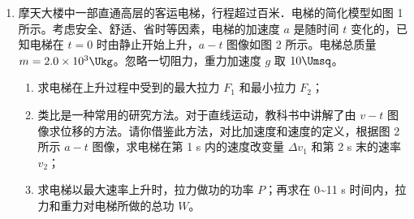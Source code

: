 \documentclass[\gkver]{gaokaozhenti}
\begin{document}
\begin{enumerate}
{\begin{enumerate}
	\item
	$0.90\UJ$

	\item
	$4.0\Ums$

\end{enumerate}
}

\item
摩天大楼中一部直通高层的客运电梯，行程超过百米．电梯的简化模型如图 1 所示。考虑安全、舒适、省时等因素，电梯的加速度 $a$ 是随时间 $t$ 变化的，已知电梯在 $t = 0$ 时由静止开始上升，$a-t$ 图像如图 2 所示。电梯总质量 $m = 2.0\times10^{3}\Ukg$。忽略一切阻力，重力加速度 $g$ 取 $10\Umsq$。
\begin{enumerate}
	\item
	求电梯在上升过程中受到的最大拉力 $F_{1}$ 和最小拉力 $F_{2}$；
	\item
	类比是一种常用的研究方法。对于直线运动，教科书中讲解了由 $v-t$ 图像求位移的方法。请你借鉴此方法，对比加速度和速度的定义，根据图 2 所示 $a-t$ 图像，求电梯在第 1 s 内的速度改变量 $\Delta v_{1}$ 和第 2 s 末的速率 $v_{2}$；
	\item
	求电梯以最大速率上升时，拉力做功的功率 $P$；再求在 0\textasciitilde{}11 s 时间内，拉力和重力对电梯所做的总功 $W$。
\end{enumerate}
\onepicture[align=right, w=8.73cm]{}
\end{enumerate}
\end{document}
